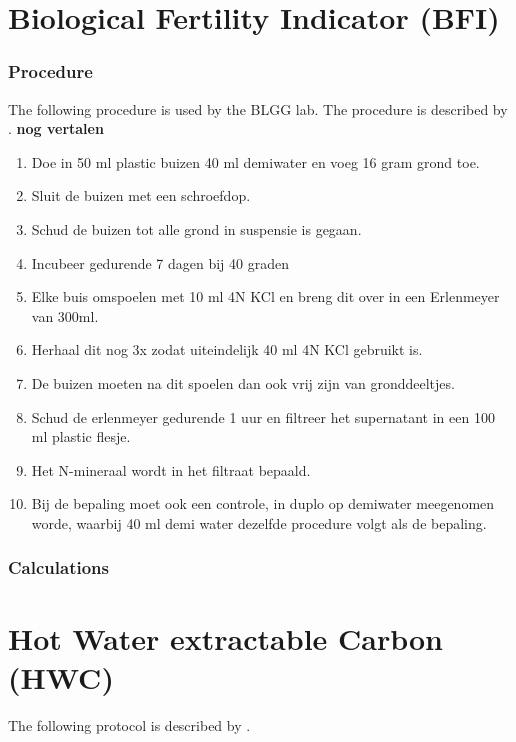 \documentclass[10pt,twoside,dutch,english]{report}
\begin{document}
\begin{appendices}
\section{Biological Fertility Indicator (BFI)}
\subsubsection{Procedure}
The following procedure is used by the BLGG lab. The procedure is described by \citet{Hanegraaf2008}. \textbf{nog vertalen}

\begin{enumerate}
\item  Doe in 50 ml plastic buizen 40 ml demiwater en voeg 16 gram grond toe. 
\item  Sluit de buizen met een schroefdop.
\item Schud de buizen tot alle grond in suspensie is gegaan.
\item Incubeer gedurende 7 dagen bij 40 graden
\item Elke buis omspoelen met 10 ml 4N KCl en breng dit over in een Erlenmeyer van 300ml.
\item Herhaal dit nog 3x zodat uiteindelijk 40 ml 4N KCl gebruikt is. 
\item De buizen moeten na dit spoelen dan ook vrij zijn van gronddeeltjes.
\item Schud de erlenmeyer gedurende 1 uur en filtreer het supernatant in een 100 ml plastic flesje.
\item Het N-mineraal wordt in het filtraat bepaald.  
\item Bij de bepaling moet ook een controle, in duplo op demiwater meegenomen worde, waarbij 40 ml demi water dezelfde procedure volgt als de bepaling.
\end{enumerate}

\subsubsection{Calculations}

\section{Hot Water extractable Carbon (HWC)}
The following protocol is described by \citet{Ghani2003}. 

\end{appendices}
\end{document}
